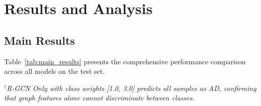 \documentclass[11pt,onecolumn,a4paper]{article}
\begin{document}
\section{Results and Analysis}
\label{sec:results}

\subsection{Main Results}

Table~\ref{tab:main_results} presents the comprehensive performance comparison across all models on the test set.

\begin{table}[H]
\centering
\caption{Performance comparison on the test set (737 samples). Best results shown in \textbf{bold}. KG-DualGCN achieves AUROC 0.8614, outperforming Concat Fusion in threshold-independent discrimination.}
\label{tab:main_results}
\par\vspace{2pt}
{\footnotesize $^\dagger$\textit{R-GCN Only with class weights [1.0, 3.0] predicts all samples as AD, confirming that graph features alone cannot discriminate between classes.}}
\end{table}
\end{document}
